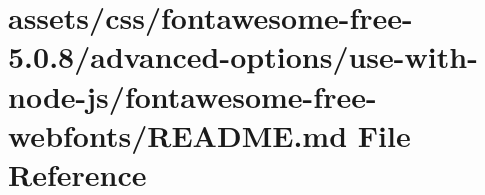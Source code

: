 \hypertarget{css_2fontawesome-free-5_80_88_2advanced-options_2use-with-node-js_2fontawesome-free-webfonts_2_r_e_a_d_m_e_8md}{}\section{assets/css/fontawesome-\/free-\/5.0.8/advanced-\/options/use-\/with-\/node-\/js/fontawesome-\/free-\/webfonts/\+R\+E\+A\+D\+ME.md File Reference}
\label{css_2fontawesome-free-5_80_88_2advanced-options_2use-with-node-js_2fontawesome-free-webfonts_2_r_e_a_d_m_e_8md}
